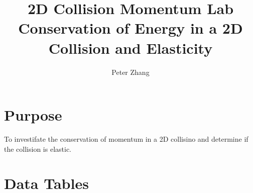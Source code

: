 \documentclass[12pt]{article}
\title{2D Collision Momentum Lab\\Conservation of Energy in a 2D Collision and Elasticity}
\author{Peter Zhang}
\begin{document}
\maketitle
\newpage


\section{Purpose}
To investifate the conservation of momentum in a 2D collisino and determine if the collision is elastic.

\section{Data Tables}
\end{document}
